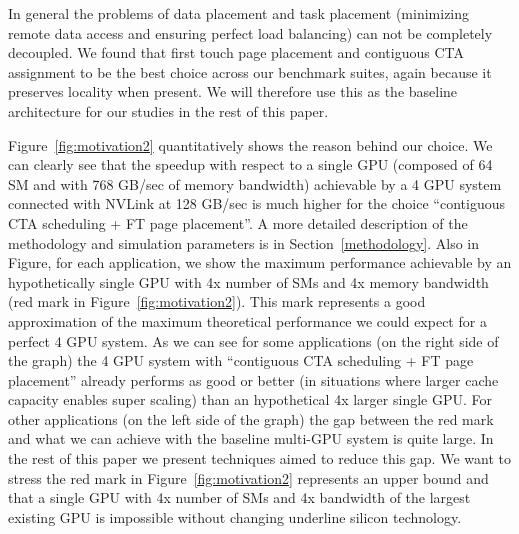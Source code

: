 In general the problems of data placement and task placement (minimizing 
remote data access and ensuring perfect load balancing) can not be completely 
decoupled. We found that first touch page placement and contiguous CTA 
assignment to be the best choice across our benchmark suites, again because it 
preserves locality when present. We will therefore use this as the baseline 
architecture for our studies in the rest of this paper.

Figure~\ref{fig:motivation2} quantitatively shows the reason behind our 
choice. We can clearly see that the speedup with respect to a single GPU 
(composed of 64 SM and with 768 GB/sec of memory bandwidth) achievable by a 4 
GPU system connected with NVLink at 128 GB/sec is much higher for the choice 
``contiguous CTA scheduling + FT page placement''. A more detailed 
description of the methodology and simulation parameters is in 
Section~\ref{methodology}. 
Also in Figure, for each application, we show the maximum  performance 
achievable by an hypothetically single GPU with 4x number of SMs and 4x 
memory bandwidth (red mark in Figure~\ref{fig:motivation2}). This mark 
represents a good approximation of the 
maximum theoretical performance we could expect for a perfect 4 GPU system. 
As we can see for some applications (on the right side of the graph) the 4 
GPU system with ``contiguous CTA scheduling + FT page placement'' already 
performs as good or better (in situations where larger cache capacity enables 
super scaling) than an hypothetical 4x larger single GPU. For other 
applications (on the left side of the graph) the gap between the red mark and 
what we can achieve with the baseline multi-GPU system is quite large. In the 
rest of this paper we present techniques aimed to reduce this gap. 
We want to stress the red mark in Figure~\ref{fig:motivation2} represents an 
upper bound and that a single GPU with 4x number of SMs and 4x bandwidth of 
the largest existing GPU is impossible without changing underline silicon 
technology. 










